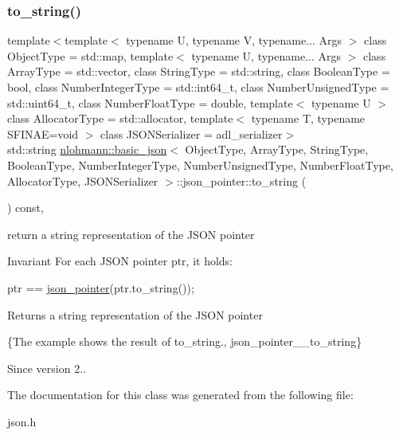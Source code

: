 \subsubsection{\texorpdfstring{to\+\_\+string()}{to\_string()}}
{\footnotesize\ttfamily template$<$template$<$ typename U, typename V, typename... Args $>$ class Object\+Type = std\+::map, template$<$ typename U, typename... Args $>$ class Array\+Type = std\+::vector, class String\+Type  = std\+::string, class Boolean\+Type  = bool, class Number\+Integer\+Type  = std\+::int64\+\_\+t, class Number\+Unsigned\+Type  = std\+::uint64\+\_\+t, class Number\+Float\+Type  = double, template$<$ typename U $>$ class Allocator\+Type = std\+::allocator, template$<$ typename T, typename S\+F\+I\+N\+A\+E=void $>$ class J\+S\+O\+N\+Serializer = adl\+\_\+serializer$>$ \\
std\+::string \hyperlink{classnlohmann_1_1basic__json}{nlohmann\+::basic\+\_\+json}$<$ Object\+Type, Array\+Type, String\+Type, Boolean\+Type, Number\+Integer\+Type, Number\+Unsigned\+Type, Number\+Float\+Type, Allocator\+Type, J\+S\+O\+N\+Serializer $>$\+::json\+\_\+pointer\+::to\+\_\+string (\begin{DoxyParamCaption}{ }\end{DoxyParamCaption}) const\hspace{0.3cm}{\ttfamily [inline]}, {\ttfamily [noexcept]}}



return a string representation of the J\+S\+ON pointer 

\begin{DoxyInvariant}{Invariant}
For each J\+S\+ON pointer {\ttfamily ptr}, it holds\+: 
\begin{DoxyCode}
ptr == \hyperlink{classnlohmann_1_1basic__json_1_1json__pointer_abaa66b0d30811b8a8670a673c686b75a}{json\_pointer}(ptr.to\_string());
\end{DoxyCode}

\end{DoxyInvariant}
\begin{DoxyReturn}{Returns}
a string representation of the J\+S\+ON pointer
\end{DoxyReturn}
\{The example shows the result of {\ttfamily to\+\_\+string}., json\+\_\+pointer\+\_\+\+\_\+to\+\_\+string\}

\begin{DoxySince}{Since}
version 2.. 
\end{DoxySince}


The documentation for this class was generated from the following file\+:\begin{DoxyCompactItemize}
\item 
json.\+h\end{DoxyCompactItemize}
